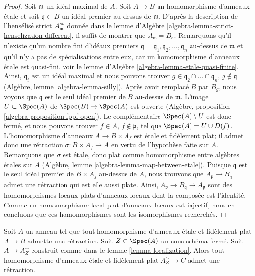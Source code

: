 \begin{proof}
Soit $\mathfrak m$ un idéal maximal de $A$. Soit $A \to B$ un homomorphisme d'anneaux
\'etale et soit $\mathfrak q \subset B$ un idéal premier
au-dessus de $\mathfrak m$. D'après la description de l'hensélisé strict
$A_\mathfrak m^{sh}$ donnée dans le
lemme d'Algèbre \ref{algebra-lemma-strict-henselization-different},
il suffit de montrer que $A_\mathfrak m = B_\mathfrak q$.
Remarquons qu'il n'existe qu'un nombre fini d'idéaux premiers
$\mathfrak q = \mathfrak q_1, \mathfrak q_2, \ldots, \mathfrak q_n$
au-dessus de $\mathfrak m$ et qu'il n'y a pas de spécialisations
entre eux, car un homomorphisme d'anneaux \'etale est quasi-fini, voir le
lemme d'Algèbre \ref{algebra-lemma-etale-quasi-finite}.
Ainsi, $\mathfrak q_i$ est un idéal maximal et nous pouvons trouver
$g \in \mathfrak q_2 \cap \ldots \cap \mathfrak q_n$, $g \not \in \mathfrak q$
(Algèbre, lemme \ref{algebra-lemma-silly}).
Après avoir remplacé $B$ par $B_g$, nous voyons que $\mathfrak q$
est le seul idéal premier de $B$ au-dessus de $\mathfrak m$.
L'image $U \subset \Spec(A)$ de $\Spec(B) \to \Spec(A)$ est
ouverte (Algèbre, proposition \ref{algebra-proposition-fppf-open}).
Le complémentaire $\Spec(A) \setminus U$ est donc fermé,
et nous pouvons trouver $f \in A$, $f \not \in \mathfrak p$, tel que
$\Spec(A) = U \cup D(f)$. L'homomorphisme d'anneaux $A \to B \times A_f$
est \'etale et fidèlement plat; il admet donc une rétraction
$\sigma : B \times A_f \to A$ en vertu de l'hypothèse faite sur $A$.
Remarquons que $\sigma$ est \'etale, donc plat comme homomorphisme entre algèbres \'etales
sur $A$ (Algèbre, lemme \ref{algebra-lemma-map-between-etale}).
Puisque $\mathfrak q$ est le seul idéal premier de $B \times A_f$ au-dessus
de $A$, nous trouvons que $A_\mathfrak p \to B_\mathfrak q$ admet
une rétraction qui est elle aussi plate. Ainsi,
$A_\mathfrak p \to B_\mathfrak q \to A_\mathfrak p$
sont des homomorphismes locaux plats d'anneaux locaux dont la composée est l'identité. Comme
un homomorphisme local plat d'anneaux locaux est injectif, nous en concluons que ces
homomorphismes sont les isomorphismes recherchés.
\end{proof}

\begin{lemma}
\label{lemma-have-sections-localize}
Soit $A$ un anneau tel que tout homomorphisme d'anneaux \'etale et fidèlement plat
$A \to B$ admette une rétraction. Soit $Z \subset \Spec(A)$ un sous-schéma fermé.
Soit $A \to A_Z^\sim$ construit comme dans le lemme \ref{lemma-localization}.
Alors tout homomorphisme d'anneaux \'etale et fidèlement plat $A_Z^\sim \to C$ admet
une rétraction.
\end{lemma}

